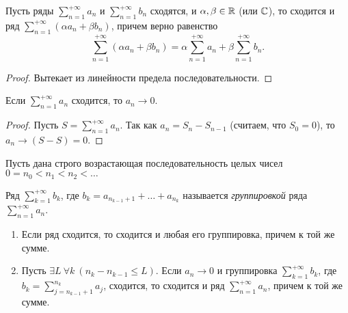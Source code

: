 \begin{lemma}[Линейность]
    Пусть ряды $\sum_{n = 1}^{+\infty}a_{n}$ и $\sum_{n = 1}^{+\infty}b_{n}$ сходятся, и $\alpha, \beta \in \mathbb{R}$ (или $\mathbb{C}$), то сходится и ряд $\sum_{n = 1}^{+\infty}(\alpha a_{n} + \beta b_{n})$, причем верно равенство
    \[\sum_{n = 1}^{+\infty}(\alpha a_n + \beta b_{n}) = \alpha \sum_{n = 1}^{+\infty}a_{n} + \beta \sum_{n = 1}^{+\infty}b_{n}.\]
\end{lemma}

\begin{proof}
    Вытекает из линейности предела последовательности.
\end{proof}

\begin{lemma}
    Если $\sum_{n = 1}^{+\infty}a_{n}$ сходится, то $a_{n} \to 0$.
\end{lemma}

\begin{proof}
    Пусть $S = \sum_{n = 1}^{+\infty}a_{n}$. Так как $a_{n} = S_n - S_{n - 1}$ (считаем, что $S_{0} = 0$), то $a_{n} \to (S - S) = 0$.
\end{proof}

\begin{definition}
    Пусть дана строго возрастающая последовательность целых чисел $0 = n_0 < n_1 < n_2 < \ldots$
    
    Ряд $\sum_{k = 1}^{+\infty}b_{k}$, где $b_k = a_{n_{k-1} + 1} + \ldots + a_{n_{k}}$ называется \textit{группировкой} ряда $\sum_{n = 1}^{+\infty}a_{n}$.
\end{definition}

\begin{lemma}
    \begin{enumerate}
        \item Если ряд сходится, то сходится и любая его группировка, причем к той же сумме.
        \item Пусть $\exists L \ \forall k \ (n_k - n_{k - 1} \leq L)$. Если $a_n \to 0$ и группировка $\sum_{k = 1}^{+\infty}b_{k}$, где $b_k = \sum_{j = n_{k - 1} + 1}^{n_k}a_{j}$, сходится, то сходится и ряд $\sum_{n = 1}^{+\infty}a_{n}$, причем к той же сумме.
    \end{enumerate}
\end{lemma}

